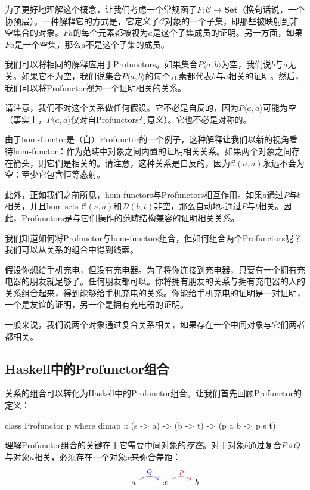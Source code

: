 \documentclass[DaoFP]{subfiles}
\begin{document}
为了更好地理解这个概念，让我们考虑一个常规函子$F \colon \mathcal{C} \to \mathbf{Set}$（换句话说，一个协预层）。一种解释它的方式是，它定义了$\mathcal{C}$对象的一个子集，即那些被映射到非空集合的对象。$F a$的每个元素都被视为$a$是这个子集成员的证明。另一方面，如果$F a$是一个空集，那么$a$不是这个子集的成员。

我们可以将相同的解释应用于Profunctors。如果集合$P \langle a, b \rangle$为空，我们说$b$与$a$无关。如果它不为空，我们说集合$P \langle a, b \rangle$的每个元素都代表$b$与$a$相关的证明。然后，我们可以将Profunctor视为一个证明相关的关系。

请注意，我们不对这个关系做任何假设。它不必是自反的，因为$P \langle a, a \rangle$可能为空（事实上，$P \langle a, a \rangle$仅对自Profunctors有意义）。它也不必是对称的。

由于hom-functor是（自）Profunctor的一个例子，这种解释让我们以新的视角看待hom-functor：作为范畴中对象之间内置的证明相关关系。如果两个对象之间存在箭头，则它们是相关的。请注意，这种关系是自反的，因为$\mathcal{C}(a, a)$永远不会为空：至少它包含恒等态射。

此外，正如我们之前所见，hom-functors与Profunctors相互作用。如果$a$通过$P$与$b$相关，并且hom-sets $\mathcal{C}(s, a)$和$\mathcal{D}(b, t)$非空，那么自动地$s$通过$P$与$t$相关。因此，Profunctors是与它们操作的范畴结构兼容的证明相关关系。

我们知道如何将Profunctor与hom-functors组合，但如何组合两个Profunctors呢？我们可以从关系的组合中得到线索。

假设你想给手机充电，但没有充电器。为了将你连接到充电器，只要有一个拥有充电器的朋友就足够了。任何朋友都可以。你将拥有朋友的关系与拥有充电器的人的关系组合起来，得到能够给手机充电的关系。你能给手机充电的证明是一对证明，一个是友谊的证明，另一个是拥有充电器的证明。

一般来说，我们说两个对象通过复合关系相关，如果存在一个中间对象与它们两者都相关。

\subsection{Haskell中的Profunctor组合}

关系的组合可以转化为Haskell中的Profunctor组合。让我们首先回顾Profunctor的定义：
\begin{haskell}
class Profunctor p where
  dimap :: (s -> a) -> (b -> t) -> (p a b -> p s t)
\end{haskell}

理解Profunctor组合的关键在于它需要中间对象的\emph{存在}。对于对象$b$通过复合$P \diamond Q$与对象$a$相关，必须存在一个对象$x$来弥合差距：
\[
 \begin{tikzcd}
  & a
  \arrow[r, bend left, blue, "Q"]
 & x
  \arrow[r, bend left, red, "P"]
 & b
  \end{tikzcd}
\]
\end{document}
